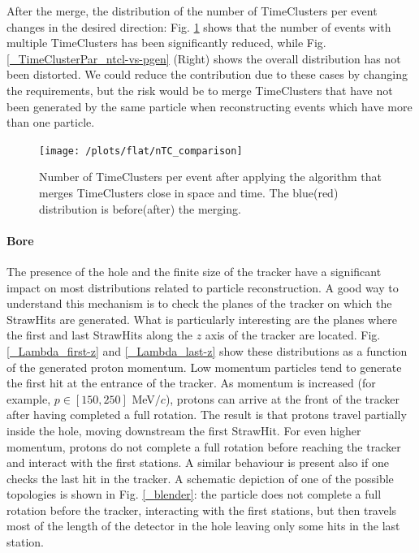 \documentclass[12pt,a4paper,openright, oneside, titlepage]{book} %
\begin{document}
\noindent After the merge, the distribution of the number of TimeClusters per event changes in the desired direction: 
Fig. \ref{_nTC_comparison} shows that the number of events with multiple TimeClusters has been significantly reduced, while Fig. \ref{_TimeClusterPar_ntcl-vs-pgen} (Right) shows the overall distribution has not been distorted.
We could reduce the contribution due to these cases by changing the requirements, 
but the risk would be to merge TimeClusters that have not been generated
by the same particle when reconstructing events which have more than one particle.

\begin{figure}[h!]
\centering
\texttt{[image: /plots/flat/nTC\_comparison]}
\caption[Number of TimeClusters pre-post merge]
{Number of TimeClusters per event after applying the algorithm 
that merges TimeClusters close in space and time. The blue(red) distribution
is before(after) the merging.}
\label{_nTC_comparison}
\end{figure}

\paragraph{Bore} 
The presence of the hole and the finite size of the tracker have a significant impact on most distributions related to particle reconstruction.
A good way to understand this mechanism is to check the planes of the tracker 
on which the StrawHits are generated.
What is particularly interesting are the planes where the first and last StrawHits 
along the $z$ axis of the tracker are located. 
Fig. \ref{_Lambda_first-z} and \ref{_Lambda_last-z} show these distributions as a function of the generated proton momentum.
Low momentum particles tend to generate the first hit at the entrance of the tracker. 
As momentum is increased (for example, $p \in [150,250]$ MeV$/c$), 
protons can arrive 
at the front of the tracker after having completed  a full rotation. 
The result is that protons travel partially inside the hole, 
moving downstream the first StrawHit.
For even higher momentum, 
protons do not complete a full rotation before reaching 
the tracker and interact with the first stations.
A similar behaviour is present also if one checks the last hit in the tracker. 
A schematic depiction of one of the possible topologies is shown in Fig. \ref{_blender}: 
the particle does not complete a full rotation before the tracker, 
interacting with the first stations, 
but then travels most of the length of the detector in the hole 
leaving only some hits in the last station.
\end{document}

